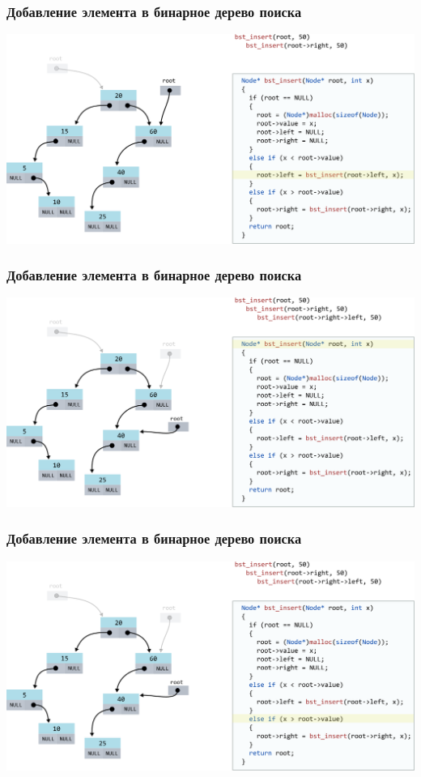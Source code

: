 \documentclass[10pt,pdf,hyperref={unicode}]{beamer}
\begin{document}
\begin{frame}[fragile]
\frametitle{Добавление элемента в бинарное дерево поиска}
\begin{center}
\includegraphics[width=\imageSizeMult\linewidth]{../images/codetree/codetree6.png}
\end{center}
\end{frame}

\begin{frame}[fragile]
\frametitle{Добавление элемента в бинарное дерево поиска}
\begin{center}
\includegraphics[width=\imageSizeMult\linewidth]{../images/codetree/codetree7.png}
\end{center}
\end{frame}

\begin{frame}[fragile]
\frametitle{Добавление элемента в бинарное дерево поиска}
\begin{center}
\includegraphics[width=\imageSizeMult\linewidth]{../images/codetree/codetree8.png}
\end{center}
\end{frame}
\end{document}
